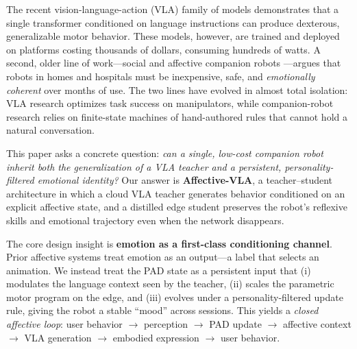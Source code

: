 \documentclass{article}
\newcommand{\method}{\textbf{Affective-VLA}}
\theoremstyle{definition}
\begin{document}
The recent vision-language-action (VLA) family of models
\cite{brohan2022rt1,brohan2023rt2,octo2023,driess2023palm_e,kim2024openvla}
demonstrates that a single transformer conditioned on language instructions can
produce dexterous, generalizable motor behavior. These models, however, are
trained and deployed on platforms costing thousands of dollars, consuming
hundreds of watts. A second, older line of work---social and affective companion
robots \cite{breazeal2003designing,picard1997affective,shibata2004paro}---argues
that robots in homes and hospitals must be inexpensive, safe, and
\emph{emotionally coherent} over months of use. The two lines have evolved in
almost total isolation: VLA research optimizes task success on manipulators,
while companion-robot research relies on finite-state machines of hand-authored
rules that cannot hold a natural conversation.

This paper asks a concrete question: \emph{can a single, low-cost companion robot
inherit both the generalization of a VLA teacher and a persistent, personality-
filtered emotional identity?} Our answer is \method{}, a teacher--student
architecture in which a cloud VLA teacher generates behavior conditioned on an
explicit affective state, and a distilled edge student preserves the robot's
reflexive skills and emotional trajectory even when the network disappears.

The core design insight is \textbf{emotion as a first-class conditioning channel}.
Prior affective systems \cite{breazeal2003designing,kismet2000} treat emotion as
an output---a label that selects an animation. We instead treat the PAD state
\cite{mehrabian1996pad} as a persistent input that (i) modulates the language
context seen by the teacher, (ii) scales the parametric motor program on the edge,
and (iii) evolves under a personality-filtered update rule, giving the robot a
stable ``mood'' across sessions. This yields a \emph{closed affective loop}:
user behavior $\rightarrow$ perception $\rightarrow$ PAD update $\rightarrow$
affective context $\rightarrow$ VLA generation $\rightarrow$ embodied expression
$\rightarrow$ user behavior.
\end{document}

